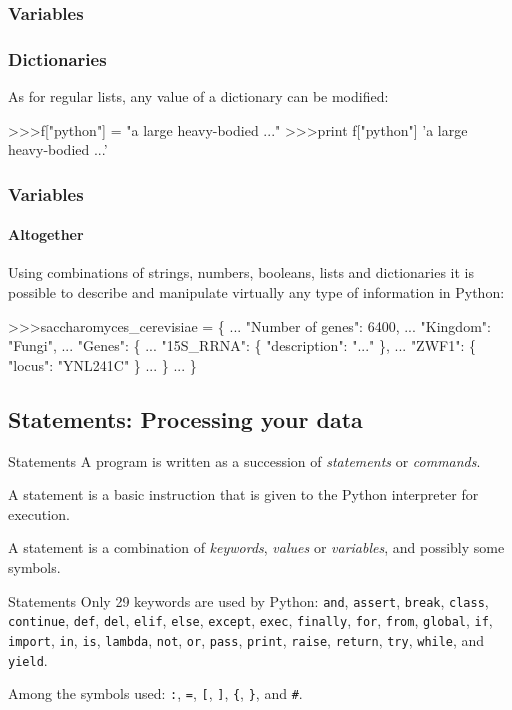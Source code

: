 \documentclass[handout]{beamer}
\def\prompt{>\hspace{-1pt}>\hspace{-1pt}>\/}
\begin{document}
\begin{frame}[fragile]
	\frametitle{Variables}
	\frametitle{Dictionaries}

	As for regular lists, any value of a dictionary can be modified:
	\begin{semiverbatim}
		\prompt f["python"] = "a large heavy-bodied ..."
		\prompt print f["python"]
		'a large heavy-bodied ...'
	\end{semiverbatim}
\end{frame}

\begin{frame}[fragile]
	\frametitle{Variables}
	\framesubtitle{Altogether}

	Using combinations of strings, numbers, booleans, lists and dictionaries it is possible to describe and manipulate virtually any type of information in Python:

	\begin{semiverbatim}
		\prompt saccharomyces_cerevisiae = \{
		...     "Number of genes": 6400,
		...     "Kingdom": "Fungi",
		...     "Genes": \{
		...        "15S_RRNA": \{ "description": "..." \},
		...        "ZWF1": \{ "locus": "YNL241C" \}
		...      \}
		...   \}
	\end{semiverbatim}
\end{frame}


\subsection[Statements: Processing your data]{Statements: Processing your data}

\begin{frame}{Statements}
	A program is written as a succession of \textit{statements} or \textit{commands}.

	\pause
	\bigskip
	A statement is a basic instruction that is given to the Python interpreter for execution.

	\pause
	\bigskip
	A statement is a combination of \textit{keywords}, \textit{values} or \textit{variables}, and possibly some symbols.
\end{frame}

\begin{frame}{Statements}
	Only 29 keywords are used by Python: \texttt{and}, \texttt{assert}, \texttt{break}, \texttt{class}, \texttt{continue}, \texttt{def}, \texttt{del}, \texttt{elif}, \texttt{else}, \texttt{except}, \texttt{exec}, \texttt{finally}, \texttt{for}, \texttt{from}, \texttt{global}, \texttt{if}, \texttt{import}, \texttt{in}, \texttt{is}, \texttt{lambda}, \texttt{not}, \texttt{or}, \texttt{pass}, \texttt{print}, \texttt{raise}, \texttt{return}, \texttt{try}, \texttt{while}, and \texttt{yield}.

	\bigskip
	Among the symbols used: \texttt{:}, \texttt{=}, \texttt{[}, \texttt{]}, \texttt{\{}, \texttt{\}}, and \texttt{\#}.
\end{frame}
\end{document}
